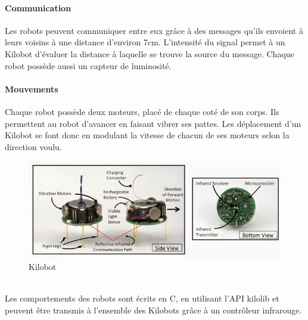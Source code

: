 \documentclass[a4paper]{article}
\begin{document}
\paragraph{Communication}Les robots peuvent communiquer entre eux grâce à des messages qu'ils envoient à leurs voisins à une distance d'environ 7cm. L'intensité du signal permet à un Kilobot d'évaluer la distance à laquelle se trouve la source du message. Chaque robot possède aussi un capteur de luminosité.
\paragraph{Mouvements}Chaque robot possède deux moteurs, placé de chaque coté de son corps. Ils permettent au robot d'avancer en faisant vibrer ses pattes. Les déplacement d'un Kilobot se font donc en modulant la vitesse de chacun de ses moteurs selon la direction voulu.\\
\begin{figure}[h]
	\begin{center}
		\centering
		\includegraphics[width=0.8\linewidth]{incl/kilobot-closeup-overview.jpg}
		\caption{Kilobot}
	\end{center}
\end{figure} \\
Les comportements des robots sont écrits en C, en utilisant l'API kilolib et peuvent être transmis à l'ensemble des Kilobots  grâce à un contrôleur infrarouge.
\end{document}
